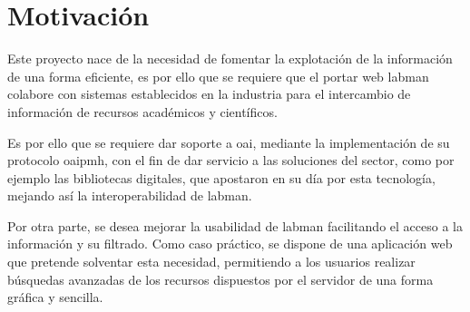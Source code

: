 \section{Motivación}

Este proyecto nace de la necesidad de fomentar la explotación de la información de una forma eficiente, es por ello que se requiere que el portar web \acrshort{labman} colabore con sistemas establecidos en la industria para el intercambio de información de recursos académicos y científicos.

Es por ello que se requiere dar soporte a \acrshort{oai}, mediante la implementación de su protocolo \acrshort{oaipmh}, con el fin de dar servicio a las soluciones del sector, como por ejemplo las bibliotecas digitales, que apostaron en su día por esta tecnología, mejando así la interoperabilidad de \acrshort{labman}.

Por otra parte, se desea mejorar la usabilidad de \acrshort{labman} facilitando el acceso a la información y su filtrado. Como caso práctico, se dispone de una aplicación web que pretende solventar esta necesidad, permitiendo a los usuarios realizar búsquedas avanzadas de los recursos dispuestos por el servidor de una forma gráfica y sencilla.





